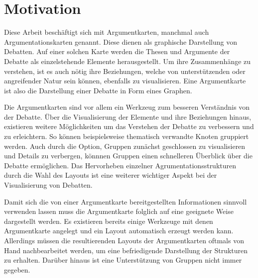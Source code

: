 \chapter{Motivation}
Diese Arbeit beschäftigt sich mit Argumentkarten, manchmal auch Argumentationskarten genannt. Diese dienen als graphische Darstellung von Debatten. 
Auf einer solchen Karte werden die Thesen und Argumente der Debatte als einzelstehende Elemente herausgestellt. 
Um ihre Zusammenhänge zu verstehen, ist es auch nötig ihre Beziehungen, welche von unterstützenden oder angreifender Natur sein können, ebenfalls zu visualisieren.
Eine Argumentkarte ist also die Darstellung einer Debatte in Form eines Graphen.

Die Argumentkarten sind vor allem ein Werkzeug zum besseren Verständnis von der Debatte. 
Über die Visualisierung der Elemente und ihre Beziehungen hinaus, existieren weitere Möglichkeiten um das Verstehen der Debatte zu verbessern und zu erleichtern.
So können beispielsweise thematisch verwandte Knoten gruppiert werden. 
Auch durch die Option, Gruppen zunächst geschlossen zu visualisieren und Details zu verbergen, könnnen Gruppen einen schnelleren Überblick über die Debatte ermöglichen.
Das Hervorheben einzelner Agrumentationsstrukturen durch die Wahl des Layouts ist eine weiterer wichtiger Aspekt bei der Visualisierung von Debatten.

Damit sich die von einer Argumentkarte bereitgestellten Informationen sinnvoll verwenden lassen muss die Argumentkarte folglich auf eine geeignete Weise dargestellt werden.
Es existieren bereits einige Werkzeuge mit denen Argumentkarte angelegt  und ein Layout automatisch erzeugt werden kann. 
Allerdings müssen die resultierenden Layouts der Argumentkarten oftmals von Hand nachbearbeitet werden, um eine befriedigende Darstellung der Strukturen zu erhalten.
Darüber hinaus ist eine Unterstützung von Gruppen nicht immer gegeben.

